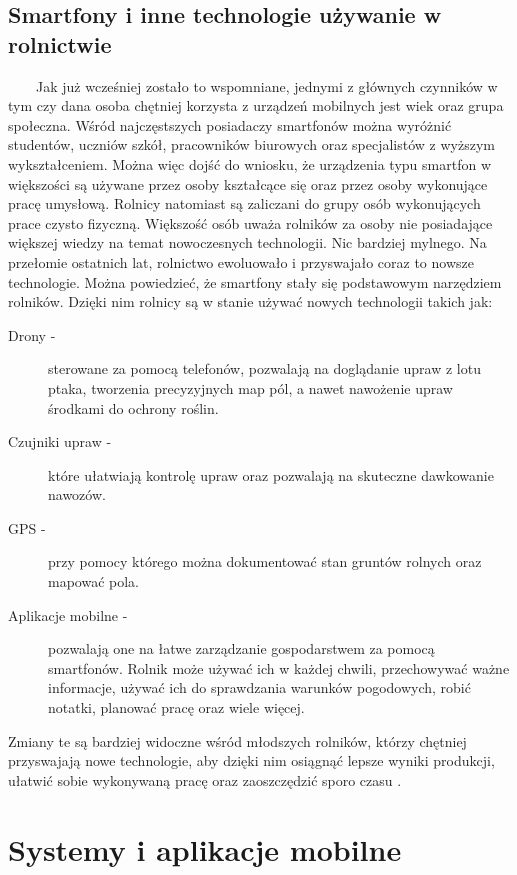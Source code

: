 \documentclass[a4paper,12pt,oneside]{book}
\begin{document}
	\section{Smartfony i inne technologie używanie w rolnictwie}
	\ \ \ \
	Jak już wcześniej zostało to wspomniane, jednymi z głównych czynników w tym czy dana osoba chętniej korzysta z urządzeń mobilnych jest wiek oraz grupa społeczna. Wśród najczęstszych posiadaczy smartfonów można wyróżnić studentów, uczniów szkół, pracowników biurowych oraz specjalistów z wyższym wykształceniem. Można więc dojść do wniosku, że urządzenia typu smartfon w większości są używane przez osoby kształcące się oraz przez osoby wykonujące pracę umysłową. Rolnicy natomiast są zaliczani do grupy osób wykonujących prace czysto fizyczną. Większość osób uważa rolników za osoby nie posiadające większej wiedzy na temat nowoczesnych technologii. Nic bardziej mylnego. Na przełomie ostatnich lat, rolnictwo ewoluowało i przyswajało coraz to nowsze technologie. Można powiedzieć, że smartfony stały się podstawowym narzędziem rolników. Dzięki nim rolnicy są w stanie używać nowych technologii takich jak:
	
	\begin{description}
		\item[Drony -] sterowane za pomocą telefonów, pozwalają na doglądanie upraw z lotu ptaka, tworzenia precyzyjnych map pól, a nawet nawożenie upraw środkami do ochrony roślin.
		\item[Czujniki upraw -] które ułatwiają kontrolę upraw oraz pozwalają na skuteczne dawkowanie nawozów.
		\item[GPS -] przy pomocy którego można dokumentować stan gruntów rolnych oraz mapować pola.
		\item[Aplikacje mobilne -] pozwalają one na łatwe zarządzanie gospodarstwem za pomocą smartfonów. Rolnik może używać ich w każdej chwili, przechowywać ważne informacje, używać ich do sprawdzania warunków pogodowych, robić notatki, planować pracę oraz wiele więcej.
	\end{description}

	Zmiany te są bardziej widoczne wśród młodszych rolników, którzy chętniej przyswajają nowe technologie, aby dzięki nim osiągnąć lepsze wyniki produkcji, ułatwić sobie wykonywaną pracę oraz zaoszczędzić sporo czasu \cite{ref5}.
	
	\newpage
	\thispagestyle{empty}
	\chapter{Systemy i aplikacje mobilne}
\end{document}
